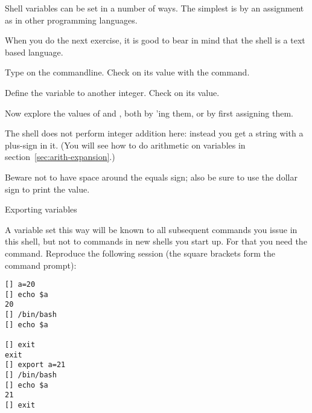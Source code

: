 Shell variables can be set in a number of ways. The simplest
is by an assignment as in other programming languages.

When you do the next exercise,
it is good to bear in mind that the shell is a text based language.

\begin{exercise}
  Type  on the commandline. Check on its value with the  command.

  Define the variable  to another integer. Check on its value.

  Now explore the values of  and , both by 'ing them,
  or by first assigning them.
\end{exercise}
\begin{outcome}
  The shell does not perform integer addition here: instead you get a string
  with a plus-sign in it.
  (You will see how to do arithmetic on variables in section~\ref{sec:arith-expansion}.)
\end{outcome}
\begin{caution}
  Beware not to have space
    around the equals sign; also be sure to use the dollar sign to print
    the value.
\end{caution}

 {Exporting variables}

A variable set this way will be known to all subsequent commands
you issue in this shell, but not to commands in new shells you start up.
For that you need the  command.
Reproduce the following session (the square brackets form the command prompt):
\begin{lstlisting}
[] a=20
[] echo $a
20
[] /bin/bash
[] echo $a

[] exit
exit
[] export a=21
[] /bin/bash
[] echo $a
21
[] exit
\end{lstlisting}

